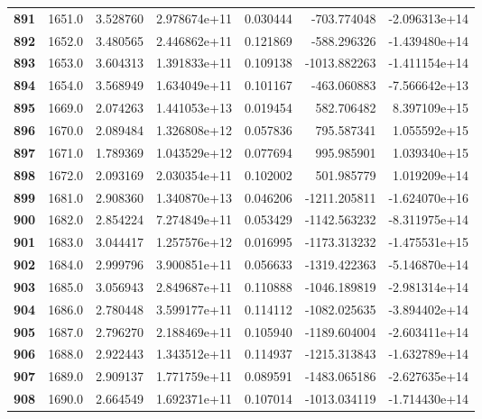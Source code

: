 \documentclass{report}[12pt]
\begin{document}
\begin{center}
\begin{tabular}{lrrrrrr}
\textbf{891 } &         1651.0 &   3.528760 &  2.978674e+11 &    0.030444 &  -703.774048 & -2.096313e+14 \\
\textbf{892 } &         1652.0 &   3.480565 &  2.446862e+11 &    0.121869 &  -588.296326 & -1.439480e+14 \\
\textbf{893 } &         1653.0 &   3.604313 &  1.391833e+11 &    0.109138 & -1013.882263 & -1.411154e+14 \\
\textbf{894 } &         1654.0 &   3.568949 &  1.634049e+11 &    0.101167 &  -463.060883 & -7.566642e+13 \\
\textbf{895 } &         1669.0 &   2.074263 &  1.441053e+13 &    0.019454 &   582.706482 &  8.397109e+15 \\
\textbf{896 } &         1670.0 &   2.089484 &  1.326808e+12 &    0.057836 &   795.587341 &  1.055592e+15 \\
\textbf{897 } &         1671.0 &   1.789369 &  1.043529e+12 &    0.077694 &   995.985901 &  1.039340e+15 \\
\textbf{898 } &         1672.0 &   2.093169 &  2.030354e+11 &    0.102002 &   501.985779 &  1.019209e+14 \\
\textbf{899 } &         1681.0 &   2.908360 &  1.340870e+13 &    0.046206 & -1211.205811 & -1.624070e+16 \\
\textbf{900 } &         1682.0 &   2.854224 &  7.274849e+11 &    0.053429 & -1142.563232 & -8.311975e+14 \\
\textbf{901 } &         1683.0 &   3.044417 &  1.257576e+12 &    0.016995 & -1173.313232 & -1.475531e+15 \\
\textbf{902 } &         1684.0 &   2.999796 &  3.900851e+11 &    0.056633 & -1319.422363 & -5.146870e+14 \\
\textbf{903 } &         1685.0 &   3.056943 &  2.849687e+11 &    0.110888 & -1046.189819 & -2.981314e+14 \\
\textbf{904 } &         1686.0 &   2.780448 &  3.599177e+11 &    0.114112 & -1082.025635 & -3.894402e+14 \\
\textbf{905 } &         1687.0 &   2.796270 &  2.188469e+11 &    0.105940 & -1189.604004 & -2.603411e+14 \\
\textbf{906 } &         1688.0 &   2.922443 &  1.343512e+11 &    0.114937 & -1215.313843 & -1.632789e+14 \\
\textbf{907 } &         1689.0 &   2.909137 &  1.771759e+11 &    0.089591 & -1483.065186 & -2.627635e+14 \\
\textbf{908 } &         1690.0 &   2.664549 &  1.692371e+11 &    0.107014 & -1013.034119 & -1.714430e+14 \\

\end{tabular}
\end{center}
\end{document}

